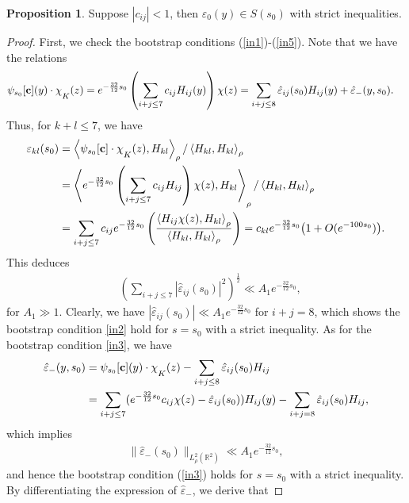 \documentclass[11pt,reqno]{amsart}
\theoremstyle{definition}
\theoremstyle{bfremark}
\newtheorem{proposition}{Proposition}[section]
\numberwithin{equation}{section}
\newcommand{\veph}{\hat\varepsilon }
\newcommand{\mchi}{\raisebox{0pt}[1ex][1ex]{$\chi$}}
\begin{document}
\begin{proposition}
\label{proposition3.1}
Suppose \(|c_{ij}|<1\), then 
\(\varepsilon_0(y)\in S(s_0)\) with strict inequalities.
\end{proposition}

\begin{proof}
    First, we check the bootstrap conditions (\ref{in1})-(\ref{in5}). Note that we have the relations
    \begin{align*}
        \psi_{s_0}[\textbf{c}](y) \cdot \mchi_K(z)&=e^{-\frac{32}{12}s_0}\left(\sum_{i+j \leq 7}c_{ij}H_{ij}(y)\right)\chi(z) =\sum_{i+j \leq 8}\veph_{ij}(s_0)H_{ij}(y)+\veph_-(y,s_0).
    \end{align*}
    Thus, for \(k+l \leq 7\), we have 
        \begin{align*}
        \varepsilon_{kl}(s_0)&=\left<\psi_{s_0}[\textbf{c}]\cdot \mchi_K(z),H_{kl}\right>_{\rho}/\left<H_{kl},H_{kl}\right>_{\rho}\\
        &=\left<e^{-\frac{32}{12}s_0}\left(\sum_{i+j \leq 7}c_{ij}H_{ij}\right)\chi(z),H_{kl}\right>_{\rho}/\left<H_{kl},H_{kl}\right>_{\rho}\\
        &=\sum_{i+j \leq 7}c_{ij}e^{-\frac{32}{12}s_0}\left(\frac{\left<H_{ij}\chi(z),H_{kl}\right>_{\rho}}{\left<H_{kl},H_{kl}\right>_{\rho}}\right) = c_{kl}e^{-\frac{32}{12}s_0}\big(1 + O(e^{-100 s_0}) \big).
    \end{align*}
This  deduces
\begin{align*}
        &\left(\sum_{i+j \leq 7}|\veph_{ij}(s_0)|^2\right)^{\frac{1}{2}} \ll A_1e^{-\frac{32}{12}s_0},       
\end{align*}
for \(A_1 \gg 1\). Clearly, we have \(|\veph_{ij}(s_0)| \ll A_1e^{-\frac{32}{12}s_0}\) for \(i+j=8\), which shows the bootstrap condition \ref{in2} hold for \(s=s_0\) with a strict inequality. As for the bootstrap condition \ref{in3}, we have
    \begin{align*}
        \veph_-(y,s_0)&=\psi_{s_0}[\textbf{c}](y)\cdot \mchi_{K}(z)-\sum_{i+j \leq 8}\veph_{ij}(s_0)H_{ij}\\
        &=\sum_{i+j \leq 7}(e^{-\frac{32}{12}s_0}c_{ij}\chi(z)-\veph_{ij}(s_0))H_{ij}(y)-\sum_{i+j=8}\veph_{ij}(s_0)H_{ij},
    \end{align*}
which implies
\begin{align*}
    \|\veph_-(s_0)\|_{L^2_{\rho}(\mathbb{R}^2)}\ll A_1e^{-\frac{32}{12}s_0},
\end{align*}
and hence the bootstrap condition (\ref{in3}) holds for \(s=s_0\) with a strict inequality. By differentiating the expression of \(\veph_-\), we derive that



\end{proof}
\end{document}
